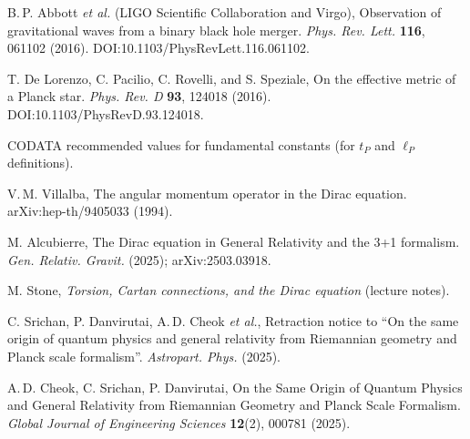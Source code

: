 \documentclass[12pt]{article}
\begin{document}
\begin{thebibliography}{99}
B.\,P. Abbott \emph{et al.} (LIGO Scientific Collaboration and Virgo),
\newblock Observation of gravitational waves from a binary black hole merger.
\newblock \emph{Phys. Rev. Lett.} \textbf{116}, 061102 (2016). DOI:10.1103/PhysRevLett.116.061102.

T. De Lorenzo, C. Pacilio, C. Rovelli, and S. Speziale,
\newblock On the effective metric of a Planck star.
\newblock \emph{Phys. Rev. D} \textbf{93}, 124018 (2016). DOI:10.1103/PhysRevD.93.124018.

CODATA recommended values for fundamental constants (for $t_P$ and $\ell_P$ definitions).

V.\,M. Villalba,
\newblock The angular momentum operator in the Dirac equation.
\newblock arXiv:hep-th/9405033 (1994).

M. Alcubierre,
\newblock The Dirac equation in General Relativity and the 3+1 formalism.
\newblock \emph{Gen. Relativ. Gravit.} (2025); arXiv:2503.03918.

M. Stone,
\newblock \emph{Torsion, Cartan connections, and the Dirac equation} (lecture notes).

C. Srichan, P. Danvirutai, A.\,D. Cheok \emph{et al.},
\newblock Retraction notice to ``On the same origin of quantum physics and general relativity from Riemannian geometry and Planck scale formalism''.
\newblock \emph{Astropart. Phys.} (2025).

A.\,D. Cheok, C. Srichan, P. Danvirutai,
\newblock On the Same Origin of Quantum Physics and General Relativity from Riemannian Geometry and Planck Scale Formalism.
\newblock \emph{Global Journal of Engineering Sciences} \textbf{12}(2), 000781 (2025).

\end{thebibliography}
\end{document}
